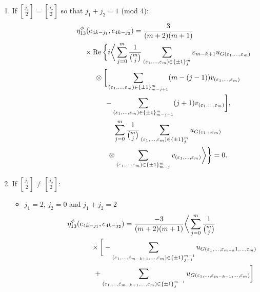 \documentclass[10pt,a4paper]{amsart}
\numberwithin{equation}{section}
\begin{document}
\begin{enumerate}\itemsep=0pt\allowdisplaybreaks
\item If $[\frac{j_1}{2}]=[\frac{j_2}{2}]$ so that $j_1+j_2=1$ (mod 4):
\begin{gather*}
 \eta_{13}^\phi(e_{4k-j_1},e_{4k-j_2}) = \frac{3}{(m+2)(m+1)}\\
\hphantom{\eta_{13}^\phi(e_{4k-j_1},e_{4k-j_2}) =}{}
\times \operatorname{Re}\bigg\{ i\bigg\langle \sum_{j=0}^{m}\frac{1}{{m\choose j}}\sum_{(\varepsilon_{1},\dots,
\varepsilon_{m})\in\{\pm 1\}_{j}^{m}}\varepsilon_{m-k+1} u_{G(\varepsilon_{1}, \dots, \varepsilon_{m})}\\
\hphantom{\eta_{13}^\phi(e_{4k-j_1},e_{4k-j_2}) =}{} \otimes \bigg[ \sum_{(\varepsilon_{1},\dots ,\varepsilon_{m})\in\{\pm
1\}_{m-j+1}^{m}}(m-(j-1))v_{(\varepsilon_{1},\dots,\varepsilon_m)}\\
\hphantom{\eta_{13}^\phi(e_{4k-j_1},e_{4k-j_2}) =}{}
-\sum_{(\varepsilon_{1},\dots, \varepsilon_{m})\in\{\pm
1\}_{m-j-1}^{m}}(j+1)v_{(\varepsilon_{1},\dots,\varepsilon_m)}\bigg],\\
\hphantom{\eta_{13}^\phi(e_{4k-j_1},e_{4k-j_2}) =}{}
 \sum_{j=0}^{m}\frac{1}{{m\choose j}}\sum_{(\varepsilon_{1},\dots, \varepsilon_{m})\in\{\pm
1\}_{j}^{m}}u_{G(\varepsilon_1\dots\varepsilon_m)}\\
\hphantom{\eta_{13}^\phi(e_{4k-j_1},e_{4k-j_2}) =}{}
\otimes
\sum_{(\varepsilon_{1},\dots, \varepsilon_{m})\in\{\pm 1\}_{m-j}^{m}}v_{(\varepsilon_1,\dots,\varepsilon_m)}\bigg\rangle\bigg\} =0.
\end{gather*}
\item If $[\frac{j_1}{2}]\neq[\frac{j_2}{2}]$:
\begin{itemize}\allowdisplaybreaks\itemsep=0pt
\item[i)] $j_1=2$, $j_2=0$ and $j_1+j_2=2$
\begin{gather*}
 \eta_{13}^\phi(e_{4k-j_1},e_{4k-j_2}) =
 \frac{-3}{(m+2)(m+1)}\bigg\langle \sum_{j=0}^{m}\frac{1}{{m\choose j}}\\
\hphantom{\eta_{13}^\phi(e_{4k-j_1},e_{4k-j_2}) =}{}\times
\bigg[{} -\sum_{(\varepsilon_{1},\dots,\hat{\varepsilon}_{m-k+1},\dots, \varepsilon_{m})\in\{\pm
1\}_{j-1}^{m-1}}u_{G(\varepsilon_{1},\dots, \varepsilon_{m-k} 1,\dots,\varepsilon_{m})}\\
\hphantom{\eta_{13}^\phi(e_{4k-j_1},e_{4k-j_2}) =}{} + \sum_{(\varepsilon_{1},\dots,\hat{\varepsilon}_{m-k+1},\dots, \varepsilon_{m})\in\{\pm 1\}_{j}^{m-1}}u_{G(\varepsilon_{1},\dots,
\varepsilon_{m-k -1}, \dots,\varepsilon_{m})} \bigg]\\

\end{gather*}
\end{itemize}
\end{enumerate}
\end{document}
